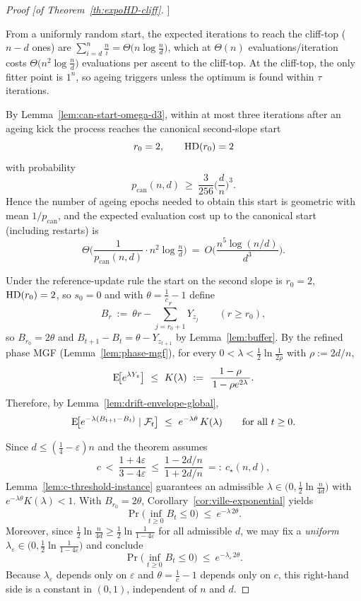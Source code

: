 \begin{proof}[Proof [of Theorem~\ref{th:expoHD-cliff}]]
	
	From a uniformly random start, the expected iterations to reach the cliff-top ($n-d$ ones) are
	$\sum_{i=d}^{n}\frac{n}{i}=\Theta\!\big(n\log\tfrac{n}{d}\big)$, which at $\Theta(n)$ evaluations/iteration costs
	$\Theta\!\big(n^{2}\log\tfrac{n}{d}\big)$ evaluations per ascent to the cliff-top. At the cliff-top, the only fitter point is $1^n$, so ageing triggers unless the optimum is found within $\tau$ iterations.
	
	By Lemma~\ref{lem:can-start-omega-d3}, within at most three iterations after an ageing kick the process reaches the canonical second-slope start
	\[
	r_0=2,\qquad \text{HD}(r_0)=2
	\]
	with probability
	\[
	p_{\mathrm{can}}(n,d)\ \ge\ \frac{3}{256}\Big(\frac{d}{n}\Big)^{\!3}.
	\]
	Hence the number of ageing epochs needed to obtain this start is geometric with mean $1/p_{\mathrm{can}}$, and the expected evaluation cost up to the canonical start (including restarts) is
	\[
	\Theta\!\Big(\frac{1}{p_{\mathrm{can}}(n,d)}\cdot n^{2}\log\tfrac{n}{d}\Big)
	\ =\ O\!\Big(\frac{n^{5}\log(n/d)}{d^{3}}\Big).
	\]
	
	\smallskip
	Under the reference-update rule the start on the second slope is $r_0=2$, $\text{HD}(r_0)=2$, so $s_0=0$ and with $\theta=\tfrac1c-1$ define
	\[
	B_r\ :=\ \theta r - \sum_{j=r_0+1}^{r} Y_{z_j}\qquad(r\ge r_0),
	\]
	so $B_{r_0}=2\theta$ and $B_{t+1}-B_t=\theta-Y_{z_{t+1}}$ by Lemma~\ref{lem:buffer}.
	By the refined phase MGF (Lemma~\ref{lem:phase-mgf}), for every $0<\lambda<\tfrac12\ln\!\tfrac{1}{2\rho}$ with $\rho:=2d/n$,
	\[
	\EE\!\big[e^{\lambda Y_z}\big]\ \le\ K(\lambda)\ :=\ \frac{1-\rho}{\,1-\rho e^{2\lambda}\,}.
	\]
	Therefore, by Lemma~\ref{lem:drift-envelope-global},
	\[
	\text{E}\!\big[e^{-\lambda(B_{t+1}-B_t)}\mid\mathcal F_t\big]\ \le\ e^{-\lambda\theta}\,K(\lambda)\qquad\text{for all }t\ge 0.
	\]
	
	Since $d\le(\tfrac14-\varepsilon)n$ and the theorem assumes
	\[
	c\ <\ \frac{1+4\varepsilon}{3-4\varepsilon}\ \le\ \frac{1-2d/n}{1+2d/n}\ =:\ c_\star(n,d),
	\]
	Lemma~\ref{lem:c-threshold-instance} guarantees an admissible $\lambda\in\big(0,\tfrac12\ln\tfrac{n}{4d}\big)$ with $e^{-\lambda\theta}K(\lambda)<1$.
	With $B_{r_0}=2\theta$, Corollary~\ref{cor:ville-exponential} yields
	\[
	\Pr\!\Big(\inf_{t\ge 0} B_t\le 0\Big)\ \le\ e^{-\lambda\,2\theta}.
	\]
	Moreover, since $\tfrac12\ln\!\tfrac{n}{4d}\ge \tfrac12\ln\!\tfrac{1}{1-4\varepsilon}$ for all admissible $d$, we may fix a \emph{uniform} $\lambda_\varepsilon\in\big(0,\tfrac12\ln\tfrac{1}{1-4\varepsilon}\big)$ and conclude
	\[
	\Pr\!\Big(\inf_{t\ge 0} B_t\le 0\Big)\ \le\ e^{-\lambda_\varepsilon\,2\theta}.
	\]
	Because $\lambda_\varepsilon$ depends only on $\varepsilon$ and $\theta=\tfrac1c-1$ depends only on $c$, this right-hand side is a constant in $(0,1)$, independent of $n$ and $d$.
	

\end{proof}

